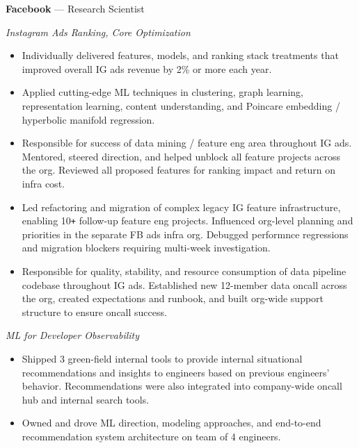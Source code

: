 \documentclass[10pt,letterpaper]{article}
\newcommand{\dates}[1]{\item[#1\hfill]}
\newcommand{\jobhead}[3]{{\dates{#1}{\bf #2} --- {#3}}}
\newcommand{\jobsubhead}[2]{{\dates{\it (#1)}{\it #2}}}
\newenvironment{jobs}
  {\leftmargini=24.1mm%
   \begin{list}%
    {}
    {\setlength\labelwidth{22mm}\itemsep=1.5mm}}
  {\end{list}}
\begin{document}
\begin{jobs}

\jobhead{2017\,--} {Facebook}{Research Scientist}

\jobsubhead{2019\,--}{Instagram Ads Ranking, Core Optimization}

\begin{itemize}
\item Individually delivered features, models, and ranking stack treatments that improved
	overall IG ads revenue by 2\% or more each year.

\item Applied cutting-edge ML techniques in clustering, graph learning, representation learning,
	content understanding, and Poincare embedding / hyperbolic manifold regression.

\item Responsible for success of data mining / feature eng area throughout IG ads. Mentored, steered
	direction, and helped unblock all feature projects across the org.
	Reviewed all proposed features for ranking impact and return on infra cost.

\item Led refactoring and migration of complex legacy IG feature infrastructure,
	enabling 10\verb!+! follow-up feature eng projects.
	Influenced org-level planning and priorities
	in the separate FB ads infra org. Debugged
	performnce regressions and migration blockers requiring multi-week investigation.

\item Responsible for quality, stability, and resource consumption of data
	pipeline codebase throughout IG ads. Established new 12-member data oncall across the
	org, created expectations and runbook, and built org-wide support structure
	to ensure oncall success.

\end{itemize}

\jobsubhead{2017\,--\,2019}{ML for Developer Observability}
\begin{itemize}

\item Shipped 3 green-field internal tools to provide internal situational
	recommendations and insights to engineers based on previous
	engineers' behavior. Recommendations were also integrated into company-wide oncall hub and
	internal search tools.

\item Owned and drove ML direction, modeling approaches, and end-to-end
	recommendation system architecture on team of 4 engineers.


\end{itemize}
\end{jobs}
\end{document}
